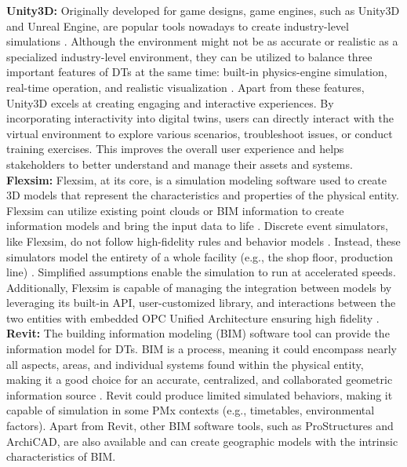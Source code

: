 \documentclass[runningheads]{llncs}
\begin{document}
\textbf{Unity3D:} Originally developed for game designs, game engines, such as Unity3D and Unreal Engine, are popular tools nowadays to create industry-level simulations \cite{rassolkin2020digital}. Although the environment might not be as accurate or realistic as a specialized industry-level environment, they can be utilized to balance three important features of DTs at the same time: built-in physics-engine simulation, real-time operation, and realistic visualization \cite{rassolkin2020digital}. Apart from these features, Unity3D excels at creating engaging and interactive experiences. By incorporating interactivity into digital twins, users can directly interact with the virtual environment to explore various scenarios, troubleshoot issues, or conduct training exercises. This improves the overall user experience and helps stakeholders to better understand and manage their assets and systems. \\

\textbf{Flexsim:} Flexsim, at its core, is a simulation modeling software used to create 3D models that represent the characteristics and properties of the physical entity. Flexsim can utilize existing point clouds or BIM information to create information models and bring the input data to life \cite{karakra2018pervasive}. Discrete event simulators, like Flexsim, do not follow high-fidelity rules and behavior models \cite{zhang2017modeling}. Instead, these simulators model the entirety of a whole facility (e.g., the shop floor, production line) \cite{pires2021digital}. Simplified assumptions enable the simulation to run at accelerated speeds. Additionally, Flexsim is capable of managing the integration between models by leveraging its built-in API, user-customized library, and interactions between the two entities with embedded OPC Unified Architecture ensuring high fidelity \cite{lohtander2018micro}.\\

\textbf{Revit:} The building information modeling (BIM) software tool can provide the information model for DTs. BIM is a process, meaning it could encompass nearly all aspects, areas, and individual systems found within the physical entity, making it a good choice for an accurate, centralized, and collaborated geometric information source \cite{kaewunruen2018digital}. Revit could produce limited simulated behaviors, making it capable of simulation in some PMx contexts (e.g., timetables, environmental factors). Apart from Revit, other BIM software tools, such as ProStructures and ArchiCAD, are also available and can create geographic models with the intrinsic characteristics of BIM.\\
\end{document}
